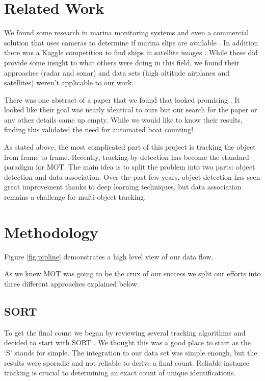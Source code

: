\documentclass[10pt,twocolumn,letterpaper]{article}
\begin{document}
\section{Related Work}

We found some research in marina monitoring systems \cite{marina_boatdetector} and even a commercial solution that uses cameras to determine if marina slips are available \cite{Nuvis}. In addition there was a Kaggle competition to find ships in satellite images \cite{kaggle_ship_detection, Stofa_2020}. While these did provide some insight to what others were doing in this field, we found their approaches (radar and sonar) and data sets (high altitude airplanes and satellites) weren't applicable to our work.

There was one abstract of a paper that we found that looked promising \cite{UCalagary}. It looked like their goal was nearly identical to ours but our search for the paper or any other details came up empty. While we would like to know their results, finding this validated the need for automated boat counting!

As stated above, the most complicated part of this project is tracking the object from frame to frame. Recently, tracking-by-detection has become the standard paradigm for MOT. The main idea is to split the problem into two parts: object detection and data association. Over the past few years, object detection has seen great improvement thanks to deep learning techniques\cite{https://doi.org/10.48550/arxiv.1506.01497}, but data association remains a challenge for multi-object tracking.

\section{Methodology}

Figure \ref{fig:pipline} demonstrates a high level view of our data flow. 

As we knew MOT was going to be the crux of our success we split our efforts into three different approaches explained below.

\subsection{SORT}

To get the final count we began by reviewing several tracking algorithms and decided to start with SORT \cite{Bewley_2016}. We thought this was a good place to start as the `S' stands for simple.  The integration to our data set was simple enough, but the results were sporadic and not reliable to derive a final count. Reliable instance tracking is crucial to determining an exact count of unique identifications.
\end{document}
